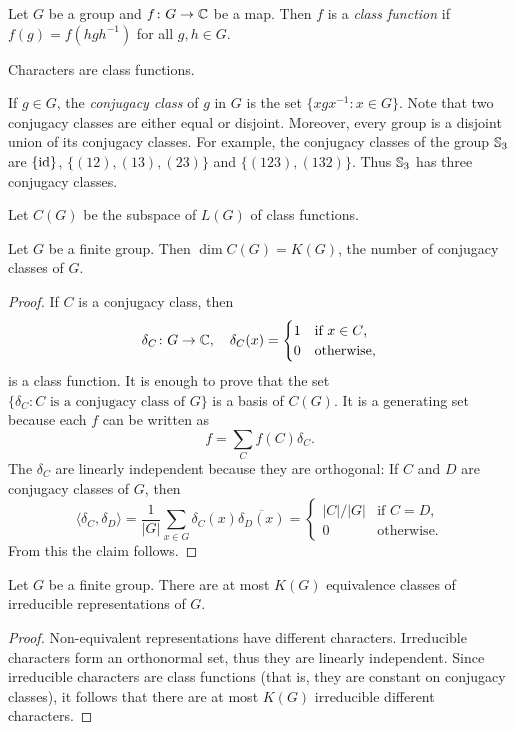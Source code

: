 \begin{definition}
	Let $G$ be a group and 
	$f\colon G\to\mathbb{C}$ be a map. Then $f$ is a \emph{class function} if
	$f(g)=f(hgh^{-1})$ for all $g,h\in G$. 	
\end{definition}

Characters are class functions. 


If $g\in G$, the \emph{conjugacy class} of $g$ in $G$ 
is the set $\{xgx^{-1}:x\in G\}$. Note that two conjugacy classes are either equal or disjoint. Moreover, 
every group is a disjoint union of its conjugacy classes. 
For example, the conjugacy classes of the group $\mathbb{S}_3$ are  
$\{\operatorname{id}\}$, $\{(12),(13),(23)\}$ and $\{(123),(132)\}$. Thus $\mathbb{S}_3$ has three conjugacy classes. 

Let $C(G)$ be the subspace of $L(G)$ of class functions. 

\begin{proposition}
    Let $G$ be a finite group. Then $\dim C(G)=K(G)$, the number of conjugacy classes of $G$.
\end{proposition}

\begin{proof}
If $C$ is a conjugacy class, 
then 
\[
\delta_C\colon G\to\mathbb{C},\quad
\delta_C(x)=\begin{cases}
    1 & \text{if $x\in C$,}\\
    0 & \text{otherwise,}
\end{cases}
\]
is a class function.  
It is enough to prove that the 
set $\{\delta_C:C\text{ is a conjugacy class of $G$}\}$ is a basis of $C(G)$.  It is a generating set
because each $f$ can be written as 
\[
f=\sum_{C}f(C)\delta_C.
\]
The $\delta_C$ are linearly independent because they are orthogonal: 
If $C$ and $D$ 
are conjugacy classes of $G$, then 
\[
\langle\delta_C,\delta_D\rangle=\frac{1}{|G|}\sum_{x\in G}\delta_C(x)\overline{\delta_D(x)}
=\begin{cases}
|C|/|G| & \text{if $C=D$},\\
0 & \text{otherwise}.
\end{cases}
\]
From this the claim follows. 
\end{proof}


\begin{corollary}
    Let $G$ be a finite group. There are at most $K(G)$ equivalence classes of irreducible representations of $G$.
\end{corollary}

\begin{proof}
    Non-equivalent representations have different characters. 
    Irreducible characters 
    form an orthonormal set, thus they are linearly 
    independent. Since irreducible characters
    are class functions (that is, they are constant on conjugacy classes), 
    it follows that there are at most $K(G)$ irreducible different characters.  
\end{proof}

